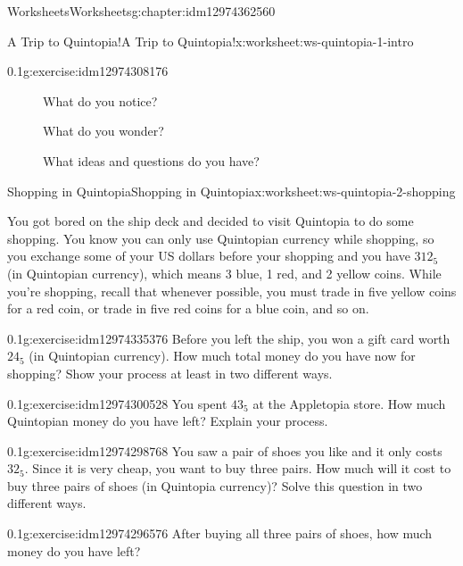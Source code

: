 \documentclass[twoside,11pt,]{book}
\begin{document}
\begin{chapterptx}{Worksheets}{}{Worksheets}{}{}{g:chapter:idm12974362560}
\begin{worksheet-section-numberless}{A Trip to Quintopia!}{}{A Trip to Quintopia!}{}{}{x:worksheet:ws-quintopia-1-intro}
\begin{divisionexercise}{2}{}{0.1}{g:exercise:idm12974308176}
\begin{description}
\item[{}]What do you notice?\item[{}]What do you wonder?\item[{}]What ideas and questions do you have?\end{description}
\end{divisionexercise}%
\end{worksheet-section-numberless}
\restoregeometry
%
%
\typeout{************************************************}
\typeout{************************************************}
%
\begin{worksheet-section-numberless}{Shopping in Quintopia}{}{Shopping in Quintopia}{}{}{x:worksheet:ws-quintopia-2-shopping}
\begin{introduction}{}%
You got bored on the ship deck and decided to visit Quintopia to do some shopping. You know you can only use Quintopian currency while shopping, so you exchange some of your US dollars before your shopping and you have \(312_{5}\) (in Quintopian currency), which means 3 blue, 1 red, and 2 yellow coins. While you’re shopping, recall that whenever possible, you must trade in five yellow coins for a red coin, or trade in five red coins for a blue coin, and so on.%
\end{introduction}%
\begin{divisionexercise}{1}{}{0.1}{g:exercise:idm12974335376}%
Before you left the ship, you won a gift card worth \(24_{5}\) (in Quintopian currency). How much total money do you have now for shopping? Show your process at least in two different ways.%
\end{divisionexercise}%
\begin{divisionexercise}{2}{}{0.1}{g:exercise:idm12974300528}%
You spent \(43_{5}\) at the Appletopia store. How much Quintopian money do you have left?  Explain your process.%
\end{divisionexercise}%
\begin{divisionexercise}{3}{}{0.1}{g:exercise:idm12974298768}%
You saw a pair of shoes you like and it only costs \(32_{5}\). Since it is very cheap, you want to buy three pairs. How much will it cost to buy three pairs of shoes (in Quintopia currency)? Solve this question in two different ways.%
\end{divisionexercise}%
\clearpage
\begin{divisionexercise}{4}{}{0.1}{g:exercise:idm12974296576}%
After buying all three pairs of shoes, how much money do you have left?%

\end{divisionexercise}
\end{worksheet-section-numberless}
\end{chapterptx}
\end{document}
